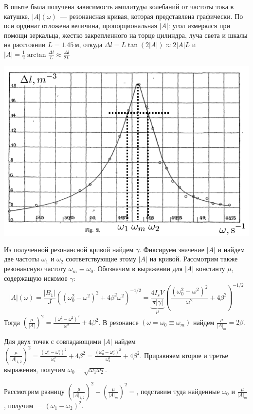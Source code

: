\documentclass[a4paper]{article}
\begin{document}
В опыте была получена зависимость амплитуды колебаний от частоты тока в катушке, $|A|(\omega)$~--- резонансная кривая, которая представлена графически. По оси ординат отложена величина, пропорциональная $|A|$: угол измерялся при помощи зеркальца, жестко закрепленного на торце цилиндра, луча света и шкалы на расстоянии $L=1.45\, \mbox{м}$, откуда $\Delta l=L\tan(2|A|)\approx2|A| L$ и $|A|=\frac{1}{2}\arctan\frac{\Delta l}{L}\approx\frac{\Delta l}{2L}$
\begin{center}
\includegraphics[width=15cm]{res}
\end{center}
Из полученной резонансной кривой найдем $\gamma$. Фиксируем значение $|A|$ и найдем две частоты $\omega_1$ и $\omega_2$ соответствующие этому $|A|$ на кривой. Рассмотрим также резонансную частоту $\omega_m\equiv\omega_0$. Обозначим в выражении для $|A|$ константу $\mu$, содержащую искомое $\gamma$:
$$
|A|(\omega)=\frac{|B_1|}{J}\left((\omega_0^2-\omega^2)^2+4\beta^2\omega^2\right)^{-1/2}=\underbrace{\frac{4I_sV}{\pi|\gamma|}}_{\mu}\left(\frac{(\omega_0^2-\omega^2)^2}{\omega^2}+4\beta^2\right)^{-1/2}
$$
Тогда $(\frac{\mu}{|A|})^2=\frac{(\omega_0^2-\omega^2)^2}{\omega^2}+4\beta^2$. В резонансе $(\omega=\omega_0\equiv\omega_m)$ найдем $\frac{\mu}{|A|_m}=2\beta$.

Для двух точек с совпадающими $|A|$ найдем $(\frac{\mu}{|A|_{1,2}})^2=\frac{(\omega_0^2-\omega_1^2)^2}{\omega_1^2}+4\beta^2=\frac{(\omega_0^2-\omega_2^2)^2}{\omega_2^2}+4\beta^2$. Приравняем второе и третье выражения, получим $\omega_0=\sqrt{\omega_1\omega_2}$.

Рассмотрим разницу $(\frac{\mu}{|A|_{1,2}})^2-(\frac{\mu}{|A|_m})^2\boxed{=}$, подставим туда найденные $\omega_0$ и $\frac{\mu}{|A|_m}$, получим $\boxed{=}(\omega_1-\omega_2)^2$.
\end{document}
